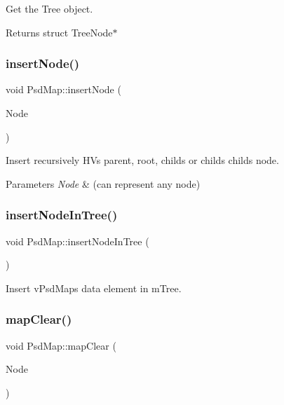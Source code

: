 Get the Tree object. 

\begin{DoxyReturn}{Returns}
struct Tree\+Node$\ast$ 
\end{DoxyReturn}
\mbox{\label{class_psd_map_ac9d868bc2459c1c403c9e5e3e2bb719a}} 
\subsubsection{\texorpdfstring{insert\+Node()}{insertNode()}}
{\footnotesize\ttfamily void Psd\+Map\+::insert\+Node (\begin{DoxyParamCaption}\item[{struct \hyperlink{struct_tree_node}{Tree\+Node} $\ast$}]{Node }\end{DoxyParamCaption})}



Insert recursively HV\textquotesingle{}s parent, root, childs or child\textquotesingle{}s childs node. 


\begin{DoxyParams}{Parameters}
{\em Node} & (can represent any node) \\
\hline
\end{DoxyParams}
\mbox{\label{class_psd_map_a7a2135f3db362df35b71fd1a12cac6c3}} 
\subsubsection{\texorpdfstring{insert\+Node\+In\+Tree()}{insertNodeInTree()}}
{\footnotesize\ttfamily void Psd\+Map\+::insert\+Node\+In\+Tree (\begin{DoxyParamCaption}{ }\end{DoxyParamCaption})}



Insert v\+Psd\+Map\textquotesingle{}s data element in m\+Tree. 

\mbox{\label{class_psd_map_a835d6753d2aecbae14115eacf2502028}} 
\subsubsection{\texorpdfstring{map\+Clear()}{mapClear()}}
{\footnotesize\ttfamily void Psd\+Map\+::map\+Clear (\begin{DoxyParamCaption}\item[{struct \hyperlink{struct_tree_node}{Tree\+Node} $\ast$}]{Node }\end{DoxyParamCaption})}



